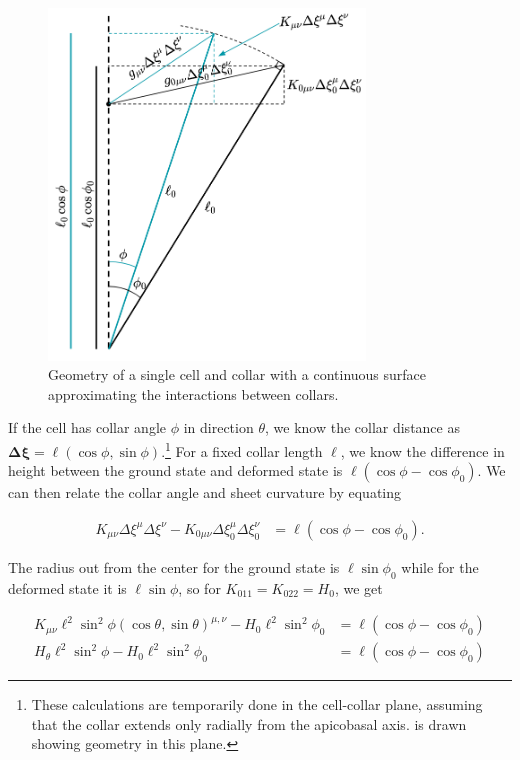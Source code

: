 \begin{figure}[htbp]
    \centering
    \includegraphics[width=0.75\textwidth]{geom.png}
    \caption[Geometry for continuous approximation of \textit{C. flexa} sheets]{Geometry of a single cell and collar with a continuous surface approximating the interactions between collars.}
    \label{fig:geom}
\end{figure}

If the cell has collar angle $\phi$ in direction $\theta$, we know the collar distance as $\bm{\Delta\xi} = \ell(\cos\phi, \sin\phi)$.\footnote{These calculations are temporarily done in the cell-collar plane, assuming that the collar extends only radially from the apicobasal axis.  is drawn showing geometry in this plane.} 
For a fixed collar length $\ell$, we know the difference in height between the ground state and deformed state is $\ell(\cos\phi - \cos\phi_0)$. 
We can then relate the collar angle and sheet curvature by equating 

\begin{align}
    K_{\mu\nu}\Delta\xi^\mu\Delta\xi^\nu - K_{0\mu\nu}\Delta\xi_0^\mu\Delta\xi_0^\nu &= \ell(\cos\phi - \cos\phi_0). \label{eq:base}
\end{align}

The radius out from the center for the ground state is $\ell\sin\phi_0$ while for the deformed state it is $\ell\sin\phi$, so for $K_{011}=K_{022}=H_0$, we get

\begin{align*}
    K_{\mu\nu}\ell^2\sin^2\phi (\cos\theta, \sin\theta)^{\mu,\nu} - H_0 \ell^2\sin^2\phi_0 &= \ell(\cos\phi - \cos\phi_0) \\
    H_\theta \ell^2\sin^2\phi - H_0 \ell^2\sin^2\phi_0 &= \ell(\cos\phi - \cos\phi_0)
\end{align*}


